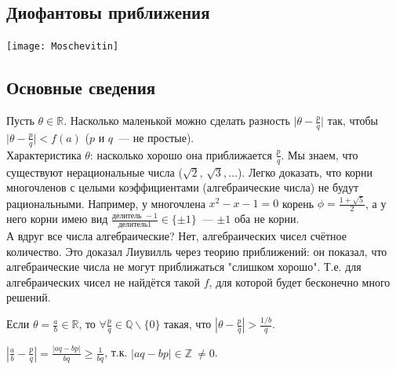 \newpage
\begin{center}
	\section{Диофантовы приближения}
\end{center}
\texttt{[image: Moschevitin]}~\\

\subsection{Основные сведения}
	Пусть $\theta \in \mathbb{R}$. Насколько маленькой можно сделать разность $\lvert \theta - \frac{p}{q} \rvert$ так, чтобы $\lvert \theta - \frac{p}{q} \rvert < f(a)$ ($p$ и $q$ — не простые).\\
	Характеристика $\theta$: насколько хорошо она приближается $\frac{p}{q}$. Мы знаем, что существуют нерациональные числа ($\sqrt{2}, \, \sqrt{3},\dots$). Легко доказать, что корни многочленов с целыми коэффициентами (алгебраические числа) не будут рациональными. Например, у многочлена $x^2 - x -1 =0$ корень $\phi = \frac{1+\sqrt{5}}{2}$, а у него корни имею вид $\frac{\text{делитель } -1}{\text{делитель} 1} \in \{ \pm 1 \}$ — $\pm 1$ оба не корни.\\
	А вдруг все числа алгебраические? Нет, алгебраических чисел счётное количество. Это доказал Лиувилль через теорию приближений: он показал, что алгебраические числа не могут приближаться "слишком хорошо". Т.е. для алгебраических чисел не найдётся такой $f$, для которой будет бесконечно много решений.\\

\begin{statement}
	Если $\displaystyle \theta = \frac{a}{b} \in \mathbb{R}$, то $\displaystyle \forall \frac{p}{q} \in \mathbb{Q} \backslash \{ 0 \}$ такая, что
	$\displaystyle \left| \theta - \frac{p}{q} \right| > \frac{1/b}{q}$.
\end{statement}
\begin{pf}
	$\displaystyle \left| \frac{a}{b} - \frac{p}{q} \right| = \frac{|aq - bp|}{bq} \geq \frac{1}{bq}$, т.к. $|aq-bp| \in \mathbb{Z} \ \ne 0$.
\end{pf}

